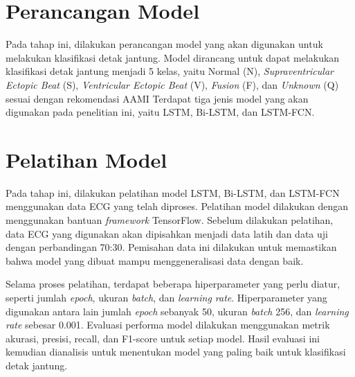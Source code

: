\section{Perancangan Model}
\label{subsec: metodologi-pembuatan-model}
Pada tahap ini, dilakukan perancangan model yang akan digunakan untuk melakukan klasifikasi detak jantung.
Model dirancang untuk dapat melakukan klasifikasi detak jantung menjadi 5 kelas, yaitu Normal (N), \textit{Supraventricular Ectopic Beat} (S), \textit{Ventricular Ectopic Beat} (V), \textit{Fusion} (F), dan \textit{Unknown} (Q) sesuai dengan rekomendasi AAMI \parencite{associationfortheadvancementofmedicalinstrumentationTestingReportingPerformance1998}
Terdapat tiga jenis model yang akan digunakan pada penelitian ini, yaitu LSTM, Bi-LSTM, dan LSTM-FCN.

\section{Pelatihan Model}
\label{subsec: metodologi-pelatihan-model}
Pada tahap ini, dilakukan pelatihan model LSTM, Bi-LSTM, dan LSTM-FCN menggunakan data ECG yang telah diproses.
Pelatihan model dilakukan dengan menggunakan bantuan \textit{framework} TensorFlow.
Sebelum dilakukan pelatihan, data ECG yang digunakan akan dipisahkan menjadi data latih dan data uji dengan perbandingan 70:30.
Pemisahan data ini dilakukan untuk memastikan bahwa model yang dibuat mampu menggeneralisasi data dengan baik.

Selama proses pelatihan, terdapat beberapa hiperparameter yang perlu diatur, seperti jumlah \textit{epoch}, ukuran \textit{batch}, dan \textit{learning rate}.
Hiperparameter yang digunakan antara lain jumlah \textit{epoch} sebanyak 50, ukuran \textit{batch} 256, dan \textit{learning rate} sebesar 0.001.
Evaluasi performa model dilakukan menggunakan metrik akurasi, presisi, recall, dan F1-score untuk setiap model.
Hasil evaluasi ini kemudian dianalisis untuk menentukan model yang paling baik untuk klasifikasi detak jantung.

